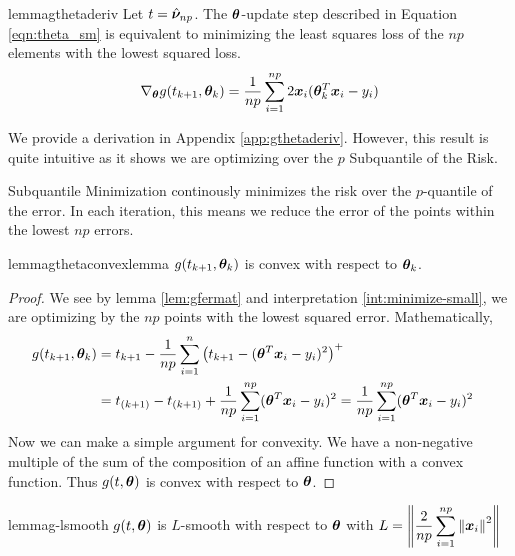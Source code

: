 \documentclass{article} %
\newcommand{\norm}[1]{\left\lVert#1\right\rVert}
\begin{document}
	\begin{restatable}{lemma}{gthetaderiv}\label{lem:gthetaderiv}
		Let $t = \hat{{\bm{\nu}}}_{np}$. The ${\bm{\theta}}$-update step described in Equation \ref{eqn:theta_sm} is equivalent to minimizing the least squares loss of the $np$ elements with the lowest squared loss.
	   \begin{equation}
			\nabla_{{\bm{\theta}}}g(t_{k+1},{\bm{\theta}}_k) = \frac{1}{np}\sum_{i=1}^{np}2{\bm{x}}_i({\bm{\theta}}_k^T{\bm{x}}_i - y_i)
		\end{equation}
	\end{restatable}
	We provide a derivation in Appendix \ref{app:gthetaderiv}. However, this result is quite intuitive as it shows we are optimizing over the $p$ Subquantile of the Risk.
	\begin{interpretation}
		\label{int:minimize-small}
		Subquantile Minimization continously minimizes the risk over the $p$-quantile of the error. In each iteration, this means we reduce the error of the points within the lowest $np$ errors.
	\end{interpretation}

		
	\begin{restatable}{lemma}{gthetaconvexlemma}
		\label{lem:gthetaconvex}
		$g(t_{k+1},{\bm{\theta}}_k)$ is convex with respect to ${\bm{\theta}}_k$.
	\end{restatable}
	\begin{proof}
		We see by lemma \ref{lem:gfermat} and interpretation \ref{int:minimize-small}, we are optimizing by the $np$ points with the lowest squared error. Mathematically, 
		\begin{align*}
			g(t_{k+1},{\bm{\theta}}_k) &= t_{k+1} - \frac{1}{np}\sum_{i=1}^{n}\left(t_{k+1} - ({\bm{\theta}}^T{\bm{x}}_i - y_i)^2\right)^+ &&\\
			&= t_{(k+1)} - t_{(k+1)} + \frac{1}{np}\sum_{i=1}^{np}({\bm{\theta}}^T{\bm{x}}_i - y_i)^2 
			= \frac{1}{np}\sum_{i=1}^{np}({\bm{\theta}}^T{\bm{x}}_i - y_i)^2 &&
		\end{align*}
		Now we can make a simple argument for convexity. We have a non-negative multiple of the sum of the composition of an affine function with a convex function. Thus $g(t,{\bm{\theta}})$ is convex with respect to ${\bm{\theta}}$.
	\end{proof}
	
	\begin{restatable}{lemma}{g-lsmooth}
		\label{lem:g-lsmooth}
		$g(t,{\bm{\theta}})$ is $L$-smooth with respect to ${\bm{\theta}}$ with $\displaystyle L = \norm{\frac{2}{np}\sum_{i=1}^{np}\norm{\vx_i}^2}$ 
	\end{restatable}
	
\end{document}
